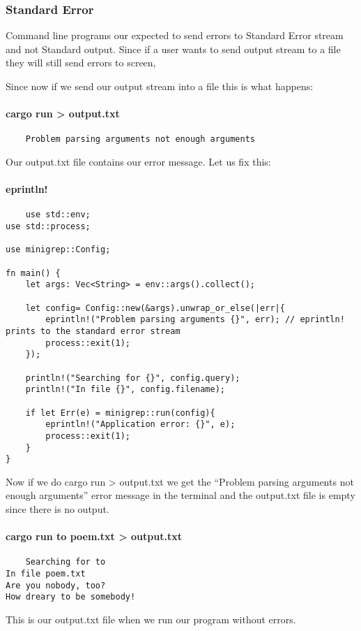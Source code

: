     \subsubsection{Standard Error}
Command line programs our expected to send errors to Standard Error stream and not Standard output. Since if a user wants to send output stream to a file they will still send errors to screen,

Since now if we send our output stream into a file this is what happens:

\paragraph*{cargo run > output.txt}\begin{lstlisting}
    Problem parsing arguments not enough arguments
\end{lstlisting}

Our output.txt file contains our error message. Let us fix this:

\paragraph*{eprintln!}\begin{lstlisting}
    use std::env;
use std::process;

use minigrep::Config;

fn main() {
    let args: Vec<String> = env::args().collect(); 
    
    let config= Config::new(&args).unwrap_or_else(|err|{
        eprintln!("Problem parsing arguments {}", err); // eprintln! prints to the standard error stream 
        process::exit(1);
    });

    println!("Searching for {}", config.query);
    println!("In file {}", config.filename);

    if let Err(e) = minigrep::run(config){
        eprintln!("Application error: {}", e);
        process::exit(1);
    }
}
\end{lstlisting}

Now if we do cargo run > output.txt we get the ``Problem parsing arguments not enough arguments'' error message in the terminal and the output.txt file is empty since there is no output.

\paragraph*{cargo run to poem.txt > output.txt}\begin{lstlisting}
    Searching for to
In file poem.txt
Are you nobody, too?
How dreary to be somebody!

\end{lstlisting} 
This is our output.txt file when we run our program without errors.

